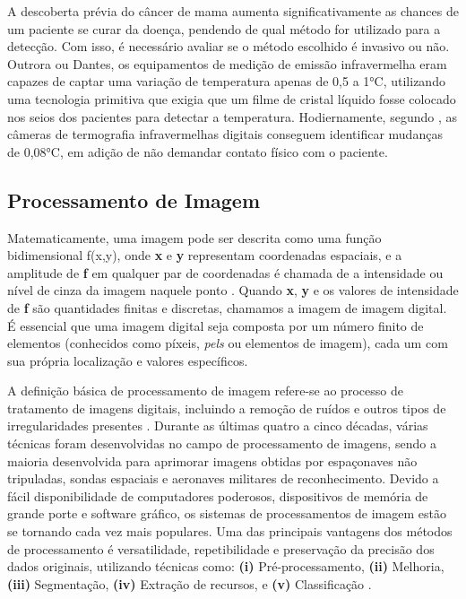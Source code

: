 A descoberta prévia do câncer de mama aumenta significativamente as chances de um paciente se curar da doença, pendendo de qual método for utilizado para a detecção. Com isso, é necessário avaliar se o método escolhido é invasivo ou não. Outrora ou Dantes, os equipamentos de medição de emissão infravermelha eram capazes de captar uma variação de temperatura apenas de 0,5 a 1°C, utilizando uma tecnologia primitiva que exigia que um filme de cristal líquido fosse colocado nos seios dos pacientes para detectar a temperatura. Hodiernamente, segundo , as câmeras de termografia infravermelhas digitais conseguem identificar mudanças de 0,08°C, em adição de não demandar contato físico com o paciente.





\subsection{\esp Processamento de Imagem}

Matematicamente, uma imagem pode ser descrita como uma função bidimensional f(x,y), onde \textbf{x} e \textbf{y} representam coordenadas espaciais, e a amplitude de \textbf{f} em qualquer par de coordenadas é chamada de a intensidade ou nível de cinza da imagem naquele ponto \cite{techniques}. Quando \textbf{x}, \textbf{y} e os valores de intensidade de \textbf{f} são quantidades finitas e discretas, chamamos a imagem de imagem digital. É essencial que uma imagem digital seja composta por um número finito de elementos (conhecidos como píxeis, \textit{pels} ou elementos de imagem), cada um com sua própria localização e valores específicos. 

A definição básica de processamento de imagem refere-se ao processo de tratamento de imagens digitais, incluindo a remoção de ruídos e outros tipos de irregularidades presentes \cite{histopathological}. Durante as últimas quatro a cinco décadas, várias técnicas foram desenvolvidas no campo de processamento de imagens, sendo a maioria desenvolvida para aprimorar imagens obtidas por espaçonaves não tripuladas, sondas espaciais e aeronaves militares de reconhecimento. Devido a fácil disponibilidade de computadores poderosos, dispositivos de memória de grande porte e software gráfico, os sistemas de processamentos de imagem estão se tornando cada vez mais populares. Uma das principais vantagens dos métodos de processamento é versatilidade, repetibilidade e preservação da precisão dos dados originais, utilizando técnicas como: \textbf{(i)} Pré-processamento, \textbf{(ii)} Melhoria, \textbf{(iii)} Segmentação, \textbf{(iv)} Extração de recursos, e \textbf{(v)} Classificação \cite{lungcancer}.


